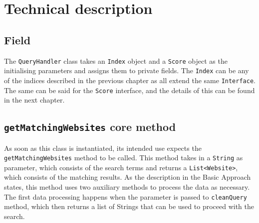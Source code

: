 \section{Technical description} %
\subsection{Field}
The {\tt QueryHandler} class takes an {\tt Index} object and a {\tt Score} object as the initialising parameters and assigns them to private fields. The {\tt Index} can be any of the indices described in the previous chapter as all extend the same {\tt Interface}. The same can be said for the {\tt Score} interface, and the details of this can be found in the next chapter. %
\subsection{{\tt getMatchingWebsites} core method}
As soon as this class is instantiated, its intended use expects the {\tt getMatchingWebsites} method to be called. This method takes in a {\tt String} as parameter, which consists of the search terms and returns a {\tt List<Website>}, which consists of the matching results. %
As the description in the Basic Approach states, this method uses two auxiliary methods to process the data as necessary. The first data processing happens when the parameter is passed to {\tt cleanQuery} method, which then returns a list of Strings that can be used to proceed with the search. %
